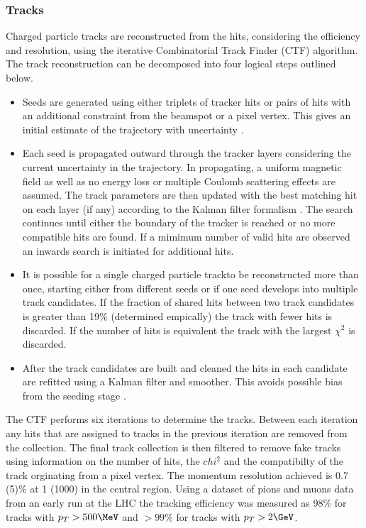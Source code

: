 \subsubsection{Tracks}
Charged particle tracks are reconstructed from the hits, considering the efficiency and resolution, 
using the iterative Combinatorial Track Finder (CTF) algorithm. The track reconstruction can be decomposed 
into four logical steps outlined below.

\begin{itemize}
\item Seeds are generated using either triplets of tracker hits or pairs of hits with an additional constraint 
from the beamspot or a pixel vertex. This gives an initial estimate of the trajectory with uncertainty \cite{tracker_early}.
\item Each seed is propagated outward through the tracker layers considering the current uncertainty in the trajectory.
In propagating, a uniform magnetic field as well as no energy loss or multiple Coulomb scattering effects are assumed.
The track parameters are then updated with the best matching hit on each layer (if any) according to the Kalman filter formalism \cite{tracker_vertex}.
The search continues until either the boundary of the tracker is reached or no more compatible hits are found. If a mimimum number
of valid hits are observed an inwards search is initiated for additional hits\cite{tracker_early}.
\item It is possible for a single charged particle trackto be reconstructed more than once, starting either from different seeds or if
one seed develops into multiple track candidates. If the fraction of shared hits between two track candidates is greater
than 19\% (determined empically) the track with fewer hits is discarded. If the number of hits is equivalent the track with
 the largest $\chi^2$ is discarded\cite{tracker_vertex}.
\item After the track candidates are built and cleaned the hits in each candidate are refitted using a Kalman filter and smoother. This 
avoids possible bias from the seeding stage \cite{tracker_vertex}.
\end{itemize}

The CTF performs six iterations to determine the tracks. Between each iteration any hits that are assigned to tracks in the
previous iteration are removed from the collection. The final track collection is then filtered to remove fake tracks using 
information on the number of hits, the $chi^2$ and the compatibilty of the track orginating from a pixel vertex. The momentum 
resolution achieved is 0.7 (5)\% at 1 (1000) \GeV in the central region\cite{tracker_early}. Using a dataset of pions and muons data from an early run 
at the LHC the tracking efficiency was measured as 98\% for tracks with $p_T > 500\MeV$ and $>99\%$ for tracks with $p_T > 2\GeV$\cite{tracker_eff}.

